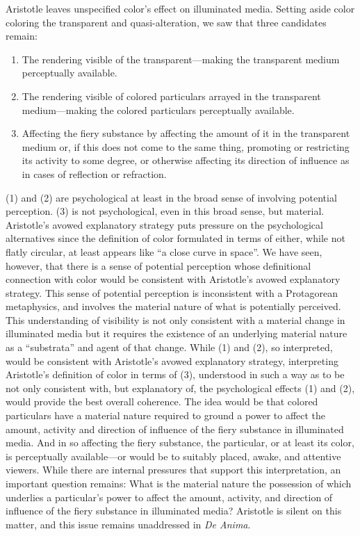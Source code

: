 Aristotle leaves unspecified color's effect on illuminated media. Setting aside color coloring the transparent and quasi-alteration, we saw that three candidates remain:
\begin{enumerate}[(1)]
	\item The rendering visible of the transparent---making the transparent medium perceptually available.
	\item The rendering visible of colored particulars arrayed in the transparent medi\-um\----\-making the colored particulars perceptually available. 
	\item Affecting the fiery substance by affecting the amount of it in the transparent medium or, if this does not come to the same thing, promoting or restricting its activity to some degree, or otherwise affecting its direction of influence as in cases of reflection or refraction. 
\end{enumerate}
(1) and (2) are psychological at least in the broad sense of involving potential perception. (3) is not psychological, even in this broad sense, but material. Aristotle's avowed explanatory strategy puts pressure on the psychological alternatives since the definition of color formulated in terms of either, while not flatly circular, at least appears like ``a close curve in space''. We have seen, however, that there is a sense of potential perception whose definitional connection with color would be consistent with Aristotle's avowed explanatory strategy. This sense of potential perception is inconsistent with a Protagorean metaphysics, and involves the material nature of what is potentially perceived. This understanding of visibility is not only consistent with a material change in illuminated media but it requires the existence of an underlying material nature as a ``substrata'' and agent of that change. While (1) and (2), so interpreted, would be consistent with Aristotle's avowed explanatory strategy, interpreting Aristotle's definition of color in terms of (3), understood in such a way as to be not only consistent with, but explanatory of, the psychological effects (1) and (2), would provide the best overall coherence. The idea would be that colored particulars have a material nature required to ground a power to affect the amount, activity and direction of influence of the fiery substance in illuminated media. And in so affecting the fiery substance, the particular, or at least its color, is perceptually available---or would be to suitably placed, awake, and attentive viewers. While there are internal pressures that support this interpretation, an important question remains: What is the material nature the possession of which underlies a particular's power to affect the amount, activity, and direction of influence of the fiery substance in illuminated media?  Aristotle is silent on this matter, and this issue remains unaddressed in \emph{De Anima}. 

